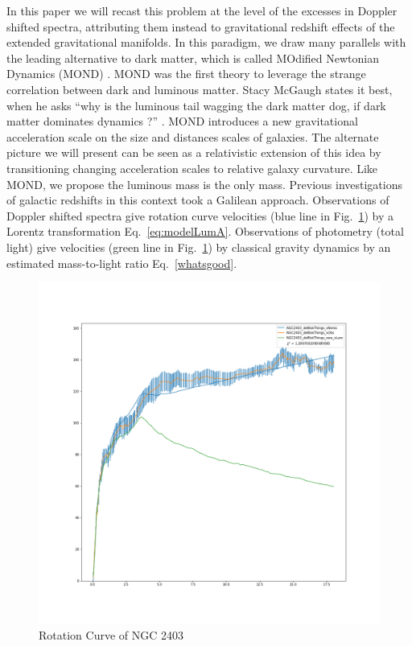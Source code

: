 \documentclass[reprint,%
 amsmath,amssymb,
 aps,
]{revtex4-1}
\begin{document}
 
 In this paper we will recast this problem at the level of the excesses in Doppler shifted spectra,  attributing them instead    to gravitational redshift effects of the extended gravitational manifolds. 
 In this paradigm, we draw many parallels with the leading alternative to dark matter, which   is called MOdified Newtonian Dynamics (MOND) \cite{Milgrom}.  MOND was the first theory to leverage the strange correlation between dark and luminous matter. Stacy McGaugh states it best, when he asks    ``why is the luminous tail wagging the dark matter dog,  if dark matter dominates dynamics ?'' \cite{1999McGaugh}. MOND introduces a new gravitational acceleration scale on the size and distances scales of galaxies. 
 The alternate picture we will present     can   be seen as a relativistic extension of this idea by transitioning changing acceleration scales to    relative galaxy curvature.   Like MOND, we propose the luminous mass is the only mass. Previous investigations of galactic redshifts in this context    took a Galilean approach\cite{MTW}.
 Observations of Doppler shifted spectra give rotation curve velocities  (blue line  in Fig.~\ref{fig:NGC2403}) by a  Lorentz transformation Eq.~\ref{eq:modelLumA}. Observations of photometry (total light) give velocities (green line  in Fig.~\ref{fig:NGC2403}) by classical gravity dynamics by an estimated mass-to-light ratio Eq.~\ref{whatsgood}.  
 
  
  
  
  
 \begin{figure}[h!]
      \centering
      \includegraphics[width=\linewidth]{NGC2403_deBlokThings_XueSofue}
      \caption{Rotation Curve of NGC 2403 \cite{Blok1}}
      \label{fig:NGC2403}
  \end{figure}
  
\end{document}
